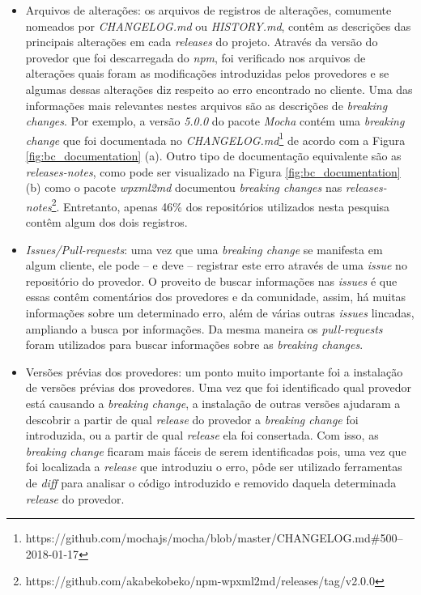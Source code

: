 \begin{itemize}
    \item Arquivos de alterações: os arquivos de registros de alterações, comumente nomeados por \textit{CHANGELOG.md} ou \textit{HISTORY.md}, contêm as descrições das principais alterações em cada \textit{releases} do projeto. Através da versão do provedor que foi descarregada do \textit{npm}, foi verificado nos arquivos de alterações quais foram as modificações introduzidas pelos provedores e se algumas dessas alterações diz respeito ao erro encontrado no cliente. Uma das informações mais relevantes nestes arquivos são as descrições de \textit{breaking changes}. Por exemplo, a versão \textit{5.0.0} do pacote \textit{Mocha} contém uma \textit{breaking change} que foi documentada no \textit{CHANGELOG.md}\footnote{https://github.com/mochajs/mocha/blob/master/CHANGELOG.md\#500--2018-01-17} de acordo com a Figura \ref{fig:bc_documentation} (a). Outro tipo de documentação equivalente são as \textit{releases-notes}, como pode ser visualizado na Figura \ref{fig:bc_documentation} (b) como o pacote \textit{wpxml2md} documentou \textit{breaking changes} nas \textit{releases-notes}\footnote{https://github.com/akabekobeko/npm-wpxml2md/releases/tag/v2.0.0}. Entretanto, apenas 46\% dos repositórios utilizados nesta pesquisa contêm algum dos dois registros.

    \item \textit{Issues/Pull-requests}: uma vez que uma \textit{breaking change} se manifesta em algum cliente, ele pode -- e deve -- registrar este erro através de uma \textit{issue} no repositório do provedor. O proveito de buscar informações nas \textit{issues} é que essas contêm comentários dos provedores e da comunidade, assim, há muitas informações sobre um determinado erro, além de várias outras \textit{issues} lincadas, ampliando a busca por informações. Da mesma maneira os \textit{pull-requests} foram utilizados para buscar informações sobre as \textit{breaking changes}.

    \item Versões prévias dos provedores: um ponto muito importante foi a instalação de versões prévias dos provedores. Uma vez que foi identificado qual provedor está causando a \textit{breaking change}, a instalação de outras versões ajudaram a descobrir a partir de qual \textit{release} do provedor a \textit{breaking change} foi introduzida, ou a partir de qual \textit{release} ela foi consertada. Com isso, as \textit{breaking change} ficaram mais fáceis de serem identificadas pois, uma vez que foi localizada a \textit{release} que introduziu o erro, pôde ser utilizado ferramentas de \textit{diff} para analisar o código introduzido e removido daquela determinada \textit{release} do provedor.


\end{itemize}

